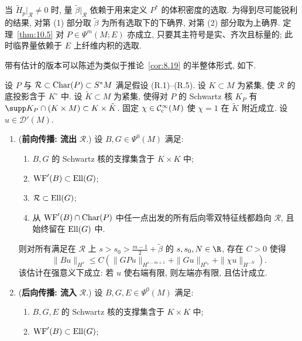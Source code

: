 \begin{remark}[选取; 丛]\label{rem:10.6}
当 $\tilde{H}_p|_{\mathcal{R}} \neq 0$ 时, 量 $\tilde{\beta}|_{\mathcal{R}}$ 依赖于用来定义 $P^*$ 的体积密度的选取. 为得到尽可能锐利的结果, 对第 (1) 部分取 $\tilde{\beta}$ 为所有选取下的下确界, 对第 (2) 部分取为上确界. 定理~\ref{thm:10.5} 对 $P \in \Psi^m(M; E)$ 亦成立, 只要其主符号是实、齐次且标量的; 此时临界量依赖于 $E$ 上纤维内积的选取.
\end{remark}

带有估计的版本可以陈述为类似于推论~\ref{cor:8.19} 的半整体形式, 如下.

\begin{theorem}\label{thm:10.7}
设 $P$ 与 $\mathcal{R} \subset \operatorname{Char}(P) \subset S^* M$ 满足假设 (R.1)--(R.5). 设 $K \subset M$ 为紧集, 使 $\mathcal{R}$ 的底投影含于 $K^\circ$ 中. 设 $\tilde{K} \subset M$ 为紧集, 使得对 $P$ 的 Schwartz 核 $K_P$ 有 $\supp K_P \cap (K \times M) \subset K \times \tilde{K}$. 固定 $\chi \in \mathcal{C}_{\mathrm{c}}^\infty(M)$ 使 $\chi = 1$ 在 $\tilde{K}$ 附近成立. 设 $u \in \mathcal{D}'(M)$.
\begin{enumerate}
    \item (\textbf{前向传播: 流出} $\mathcal{R}$.) 设 $B, G \in \Psi^0(M)$ 满足:
    \begin{enumerate}
        \item[(i)] $B, G$ 的 Schwartz 核的支撑集含于 $K \times K$ 中;
        \item[(ii)] $\operatorname{WF}'(B) \subset \operatorname{Ell}(G)$;
        \item[(iii)] $\mathcal{R} \subset \operatorname{Ell}(G)$;
        \item[(iv)] 从 $\operatorname{WF}'(B) \cap \operatorname{Char}(P)$ 中任一点出发的所有后向零双特征线都趋向 $\mathcal{R}$, 且始终留在 $\operatorname{Ell}(G)$ 中.
    \end{enumerate}
    则对所有满足在 $\mathcal{R}$ 上 $s > s_0 > \frac{m-1}{2} + \tilde{\beta}$ 的 $s, s_0, N \in \R$, 存在 $C > 0$ 使得
    \begin{equation}\label{eq:10.22}
        \|B u\|_{H^s} \le C \left( \|G P u\|_{H^{s-m+1}} + \|G u\|_{H^{s_0}} + \|\chi u\|_{H^{-N}} \right).
    \end{equation}
    该估计在强意义下成立: 若 $u$ 使右端有限, 则左端亦有限, 且估计成立.
    \item (\textbf{后向传播: 流入} $\mathcal{R}$.) 设 $B, G, E \in \Psi^0(M)$ 满足:
    \begin{enumerate}
        \item[(i)] $B, G, E$ 的 Schwartz 核的支撑集含于 $K \times K$ 中;
        \item[(ii)] $\operatorname{WF}'(B) \subset \operatorname{Ell}(G)$;

\end{enumerate}
\end{enumerate}
\end{theorem}

